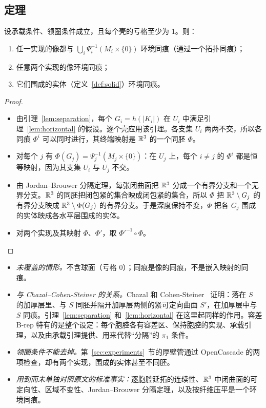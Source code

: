 \subsection{定理}

\begin{theorem}[唯一性]\label{thm:uniqueness}
设承载条件、领圈条件成立，且每个壳的亏格至少为 1。则：
\begin{enumerate}
\item 任一实现的像都与 $\bigcup_i\Psi_i^{-1}(M_i\times\{0\})$ 环境同痕（通过一个拓扑同痕）；
\item 任意两个实现的像环境同痕；
\item 它们围成的实体（定义~\ref{def:solid}）环境同痕。
\end{enumerate}
\end{theorem}
\begin{proof}
\begin{itemize}
\item 由引理~\ref{lem:separation}，每个 $G_i=h(|K_i|)$ 在 $U_i$ 中满足引理~\ref{lem:horizontal} 的假设。逐个壳应用该引理。各支集 $U_i$ 两两不交，所以各同痕 $\Phi^i$ 可以同时进行，其终端映射是 $\mathbb{R}^3$ 的一个同胚 $\Phi$。
\item 对每个 $j$ 有 $\Phi(G_j)=\Psi_j^{-1}(M_j\times\{0\})$：在 $U_j$ 上，每个 $i\ne j$ 的 $\Phi^i$ 都是恒等映射，因为其支集 $U_i$ 与 $U_j$ 不交。
\item 由 Jordan--Brouwer 分隔定理，每张闭曲面把 $\mathbb{R}^3$ 分成一个有界分支和一个无界分支。$\mathbb{R}^3$ 的同胚把闭包紧的集合映成闭包紧的集合，所以 $\Phi$ 把 $\mathbb{R}^3\setminus G_j$ 的有界分支映成 $\mathbb{R}^3\setminus\Phi(G_j)$ 的有界分支。于是深度保持不变，$\Phi$ 把各 $G_j$ 围成的实体映成各水平层围成的实体。
\item 对两个实现及其映射 $\Phi$、$\Phi'$，取 $\Phi'^{-1}\circ\Phi$。
\end{itemize}
\end{proof}

\begin{remark}
\begin{itemize}
\item \emph{未覆盖的情形。}不含球面（亏格 0）；同痕是像的同痕，不是嵌入映射的同痕。
\item \emph{与 Chazal--Cohen-Steiner 的关系。}Chazal 和 Cohen-Steiner~\cite[Thm.~2.1]{CCS05} 证明：落在 $S$ 的加厚层里、与 $S$ 同胚并隔开加厚层两侧的紧可定向曲面 $S'$，在加厚层中与 $S$ 同痕。引理~\ref{lem:separation} 和~\ref{lem:horizontal} 在这里起同样的作用。容差 B-rep 特有的是整个设定：每个胞腔各有容差区、保持胞腔的实现、承载引理，以及由承载引理提供、用来代替``分隔''的 $\pi_1$ 条件。
\item \emph{领圈条件不能去掉。}第~\ref{sec:experiments}~节的厚壁管通过 OpenCascade 的两项检查，却有两个实现，围成的实体甚至不同胚。
\item \emph{用到而未单独对照原文的标准事实：}逐胞腔延拓的连续性、$\mathbb{R}^3$ 中闭曲面的可定向性、区域不变性、Jordan--Brouwer 分隔定理，以及按纤维压平是一个环境同痕。
\end{itemize}
\end{remark}
